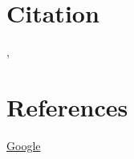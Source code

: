 \documentclass{article}
\begin{document}
	\section{Citation}
	\cite{sawyer1998software},

	\section{References}
	
	
	
	\href{www.google.com}{ \color{blue} Google}
\end{document}
